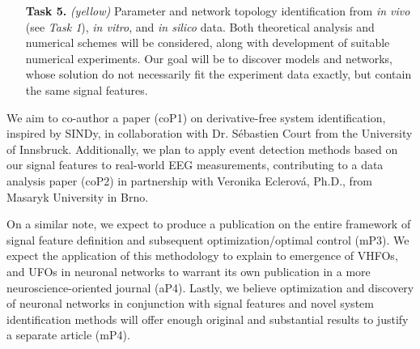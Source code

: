 \documentclass[a4paper,11pt]{scrartcl}
\begin{document}
\begin{itemize}
    \item[\textbf{Task 5.}] \textit{(yellow)} Parameter and network topology identification from \textit{in vivo} (see \textit{Task 1}), \textit{in vitro}, and \textit{in silico} data. Both theoretical analysis and numerical schemes will be considered, along with development of suitable numerical experiments. Our goal will be to discover models and networks, whose solution do not necessarily fit the experiment data exactly, but contain the same signal features.
\end{itemize}

We aim to co-author a paper (coP1) on derivative-free system identification, inspired by SINDy, in collaboration with Dr. Sébastien Court from the University of Innsbruck. Additionally, we plan to apply event detection methods based on our signal features to real-world EEG measurements, contributing to a data analysis paper (coP2) in partnership with Veronika Eclerová, Ph.D., from Masaryk University in Brno.

On a similar note, we expect to produce a publication on the entire framework of signal feature definition and subsequent optimization/optimal control (mP3). We expect the application of this methodology to explain to emergence of VHFOs, and UFOs in neuronal networks to warrant its own publication in a more neuroscience-oriented journal (aP4). Lastly, we believe optimization and discovery of neuronal networks in conjunction with signal features and novel system identification methods will offer enough original and substantial results to justify a separate article (mP4).
\end{document}
